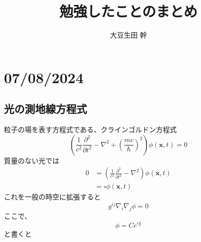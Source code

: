 \documentclass[dvipdfmx]{report} %
\title{勉強したことのまとめ}
\author{大豆生田 幹}
\date{}
\begin{document}
\maketitle %
\tableofcontents %

\chapter{07/08/2024}

\section{光の測地線方程式}
粒子の場を表す方程式である、クラインゴルドン方程式
\[ \left( \frac{1}{c^2}\frac{\partial^2}{\partial t^2} - \nabla^2 + \left( \frac{mc}{\hbar} \right)^2 \right) \phi(\bm{x}, t) = 0 \]
質量のない光では
\begin{equation*}
\begin{split}
	0 &= \left( \frac{1}{c^2}\frac{\partial^2}{\partial t^2} - \nabla^2 \right)\phi(\bm{x}, t)\\
	&= \square \phi(\bm{x}, t)
\end{split}
\end{equation*}
これを一般の時空に拡張すると
\[ g^{ij} \nabla_i \nabla_j \phi = 0 \]
ここで、\[ \phi = Ce^{i\frac{s}{\epsilon}} \] と書くと
\end{document}
